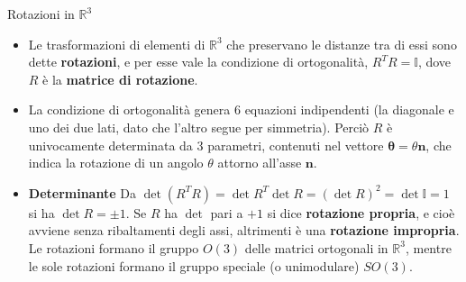 \documentclass[a4_2,grid,frame]{flashcards}
\newenvironment{cartaflash}
    {\vspace{-15pt}
    \begin{itemize}
    }
    {
    \end{itemize}
    }
\begin{document}
\begin{flashcard}[Proprietà]{Rotazioni in $\mathbb{R}^3$}
\begin{cartaflash}
\item Le trasformazioni di elementi di $\mathbb{R}^3$ che preservano le distanze tra di essi sono dette \textbf{rotazioni}, e per esse vale la condizione di ortogonalità, $R^T R = \mathbb{I}$, dove $R$ è la \textbf{matrice di rotazione}.
\item La condizione di ortogonalità genera $6$ equazioni indipendenti (la diagonale e uno dei due lati, dato che l'altro segue per simmetria). Perciò $R$ è univocamente determinata da $3$ parametri, contenuti nel vettore $\bm{\theta} = \theta \bm{n}$, che indica la rotazione di un angolo $\theta$ attorno all'asse $\bm{n}$.
\item \textbf{Determinante} Da $\operatorname{det}(R^T R) = \operatorname{det} R^T \operatorname{det} R = (\operatorname{det} R)^2 = \operatorname{det} \mathbb{I} = 1$ si ha $\operatorname{det} R = \pm 1$. Se $R$ ha $\operatorname{det}$ pari a $+1$ si dice \textbf{rotazione propria}, e cioè avviene senza ribaltamenti degli assi, altrimenti è una \textbf{rotazione impropria}. Le rotazioni formano il gruppo $O(3)$ delle matrici ortogonali in $\mathbb{R}^3$, mentre le sole rotazioni formano il gruppo speciale (o unimodulare) $SO(3)$.
\end{cartaflash}
\end{flashcard}
\end{document}
